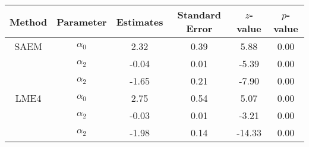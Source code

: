 \begin{table}[ht]
\centering
\begin{tabular}{cccccc}
  \hline
Method & Parameter & Estimates & Standard Error & $z$-value & $p$-value \\ 
  \hline
SAEM & $\alpha_0$ & 2.32 & 0.39 & 5.88 & 0.00 \\ 
   & $\alpha_2$ & -0.04 & 0.01 & -5.39 & 0.00 \\ 
   & $\alpha_2$ & -1.65 & 0.21 & -7.90 & 0.00 \\ 
  LME4 & $\alpha_0$ & 2.75 & 0.54 & 5.07 & 0.00 \\ 
   & $\alpha_2$ & -0.03 & 0.01 & -3.21 & 0.00 \\ 
   & $\alpha_2$ & -1.98 & 0.14 & -14.33 & 0.00 \\ 
   \hline
\end{tabular}
\end{table}
